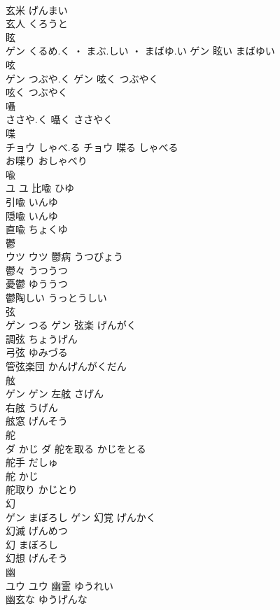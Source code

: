 \documentclass[8pt]{extreport}
\begin{document}
\begin{CJK}{UTF8}{min}
\\	玄米	げんまい	
\\	玄人	くろうと	
\\	眩	
\\	ゲン	くるめ.く ・ まぶ.しい ・ まばゆ.い	ゲン													眩い	まばゆい	
\\	呟	
\\	ゲン	つぶや.く	ゲン	呟く	つぶやく	
\\	呟く	つぶやく	
\\	囁	
\\	ささや.く														囁く	ささやく	
\\	喋	
\\	チョウ	しゃべ.る	チョウ	喋る	しゃべる	
\\	お喋り	おしゃべり	
\\	喩	
\\	ユ		ユ	比喩	ひゆ	
\\	引喩	いんゆ	
\\	隠喩	いんゆ	
\\	直喩	ちょくゆ	
\\	鬱	
\\	ウツ		ウツ	鬱病	うつびょう	
\\	鬱々	うつうつ	
\\	憂鬱	ゆううつ	
\\	鬱陶しい	うっとうしい	
\\	弦	
\\	ゲン	つる	ゲン	弦楽	げんがく	
\\	調弦	ちょうげん	
\\	弓弦	ゆみづる	
\\	管弦楽団	かんげんがくだん	
\\	舷	
\\	ゲン		ゲン	左舷	さげん	
\\	右舷	うげん	
\\	舷窓	げんそう	
\\	舵	
\\	ダ	かじ	ダ	舵を取る	かじをとる	
\\	舵手	だしゅ	
\\	舵	かじ	
\\	舵取り	かじとり	
\\	幻	
\\	ゲン	まぼろし	ゲン	幻覚	げんかく	
\\	幻滅	げんめつ	
\\	幻	まぼろし	
\\	幻想	げんそう	
\\	幽	
\\	ユウ		ユウ	幽霊	ゆうれい	
\\	幽玄な	ゆうげんな	

\end{CJK}
\end{document}
